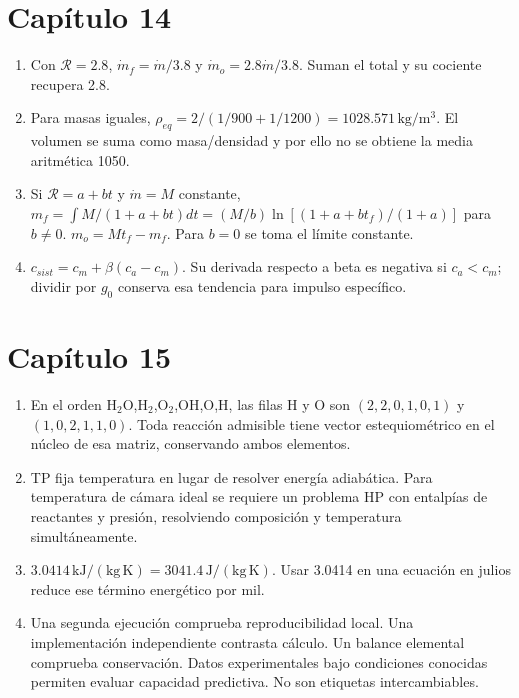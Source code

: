 \section*{Capítulo 14}
\begin{enumerate}
\item Con $\mathcal R=2.8$, $\dot m_f=\dot m/3.8$ y $\dot m_o=2.8\dot m/3.8$. Suman el total y su cociente recupera 2.8.
\item Para masas iguales, $\rho_{eq}=2/(1/900+1/1200)=1028.571\,\mathrm{kg/m^3}$. El volumen se suma como masa/densidad y por ello no se obtiene la media aritmética 1050.
\item Si $\mathcal R=a+bt$ y $\dot m=M$ constante, $m_f=\int M/(1+a+bt)dt=(M/b)\ln[(1+a+bt_f)/(1+a)]$ para $b\ne0$. $m_o=Mt_f-m_f$. Para $b=0$ se toma el límite constante.
\item $c_{sist}=c_m+\beta(c_a-c_m)$. Su derivada respecto a beta es negativa si $c_a<c_m$; dividir por $g_0$ conserva esa tendencia para impulso específico.
\end{enumerate}
\section*{Capítulo 15}
\begin{enumerate}
\item En el orden H$_2$O,H$_2$,O$_2$,OH,O,H, las filas H y O son $(2,2,0,1,0,1)$ y $(1,0,2,1,1,0)$. Toda reacción admisible tiene vector estequiométrico en el núcleo de esa matriz, conservando ambos elementos.
\item TP fija temperatura en lugar de resolver energía adiabática. Para temperatura de cámara ideal se requiere un problema HP con entalpías de reactantes y presión, resolviendo composición y temperatura simultáneamente.
\item $3.0414\,\mathrm{kJ/(kg\,K)}=3041.4\,\mathrm{J/(kg\,K)}$. Usar 3.0414 en una ecuación en julios reduce ese término energético por mil.
\item Una segunda ejecución comprueba reproducibilidad local. Una implementación independiente contrasta cálculo. Un balance elemental comprueba conservación. Datos experimentales bajo condiciones conocidas permiten evaluar capacidad predictiva. No son etiquetas intercambiables.
\end{enumerate}
